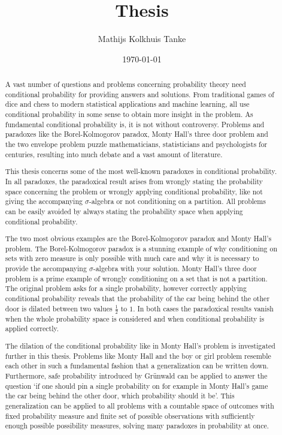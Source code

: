\documentclass[a4paper]{report}
\title{Thesis}
\author{Mathijs Kolkhuis Tanke}
\date{\today}
\theoremstyle{plain}
\theoremstyle{definition}
\theoremstyle{remark}
\numberwithin{equation}{chapter}
\DeclareMathOperator{\1}{\mathbbm{1}}
\begin{document}
\begin{titlepage}

\end{titlepage}


\begin{abstract}
A vast number of questions and problems concerning probability theory need conditional probability for providing answers and solutions. From traditional games of dice and chess to modern statistical applications and machine learning, all use conditional probability in some sense to obtain more insight in the problem. As fundamental conditional probability is, it is not without controversy. Problems and paradoxes like the Borel-Kolmogorov paradox, Monty Hall's three door problem and the two envelope problem puzzle mathematicians, statisticians and psychologists for centuries, resulting into much debate and a vast amount of literature.

This thesis concerns some of the most well-known paradoxes in conditional probability. In all paradoxes, the paradoxical result arises from wrongly stating the probability space concerning the problem or wrongly applying conditional probability, like not giving the accompanying $\sigma$-algebra or not conditioning on a partition. All problems can be easily avoided by always stating the probability space when applying conditional probability.

The two most obvious examples are the Borel-Kolmogorov paradox and Monty Hall's problem. The Borel-Kolmogorov paradox is a stunning example of why conditioning on sets with zero measure is only possible with much care and why it is necessary to provide the accompanying $\sigma$-algebra with your solution. Monty Hall's three door problem is a prime example of wrongly conditioning on a set that is not a partition. The original problem asks for a single probability, however correctly applying conditional probability reveals that the probability of the car being behind the other door is dilated between two values $\frac{1}{2}$ to $1$. In both cases the paradoxical results vanish when the whole probability space is considered and when conditional probability is applied correctly.

The dilation of the conditional probability like in Monty Hall's problem is investigated further in this thesis. Problems like Monty Hall and the boy or girl problem resemble each other in such a fundamental fashion that a generalization can be written down. Furthermore, safe probability introduced by Grünwald \cite{Grunwald18} can be applied to answer the question `if one should pin a single probability on for example in Monty Hall's game the car being behind the other door, which probability should it be'. This generalization can be applied to all problems with a countable space of outcomes with fixed probability measure and finite set of possible observations with sufficiently enough possible possibility measures, solving many paradoxes in probability at once.


\end{abstract}
\end{document}
